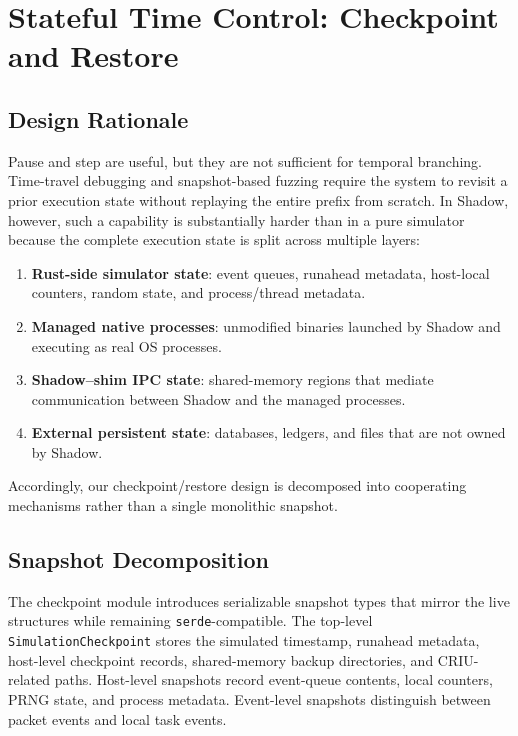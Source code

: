 \documentclass[11pt,a4paper]{article}
\begin{document}
\section{Stateful Time Control: Checkpoint and Restore}

\subsection{Design Rationale}

Pause and step are useful, but they are not sufficient for temporal
branching. Time-travel debugging and snapshot-based fuzzing require the system
to revisit a prior execution state without replaying the entire prefix from
scratch. In Shadow, however, such a capability is substantially harder than
in a pure simulator because the complete execution state is split across
multiple layers:

\begin{enumerate}[leftmargin=1.7em]
  \item \textbf{Rust-side simulator state}: event queues, runahead metadata,
  host-local counters, random state, and process/thread metadata.
  \item \textbf{Managed native processes}: unmodified binaries launched by
  Shadow and executing as real OS processes.
  \item \textbf{Shadow--shim IPC state}: shared-memory regions that mediate
  communication between Shadow and the managed processes.
  \item \textbf{External persistent state}: databases, ledgers, and files that
  are not owned by Shadow.
\end{enumerate}

Accordingly, our checkpoint/restore design is decomposed into cooperating
mechanisms rather than a single monolithic snapshot.

\subsection{Snapshot Decomposition}

The checkpoint module introduces serializable snapshot types that mirror the
live structures while remaining \texttt{serde}-compatible. The top-level
\texttt{SimulationCheckpoint} stores the simulated timestamp, runahead
metadata, host-level checkpoint records, shared-memory backup directories, and
CRIU-related paths. Host-level snapshots record event-queue contents, local
counters, PRNG state, and process metadata. Event-level snapshots distinguish
between packet events and local task events.
\end{document}
